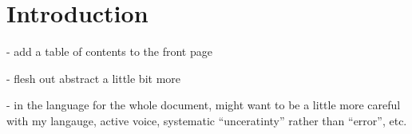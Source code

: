 
\graphicspath{}

\section{Introduction}

- add a table of contents to the front page

- flesh out abstract a little bit more

- in the language for the whole document, might want to be a little more careful with my langauge, active voice, systematic ``unceratinty'' rather than ``error'', etc.
